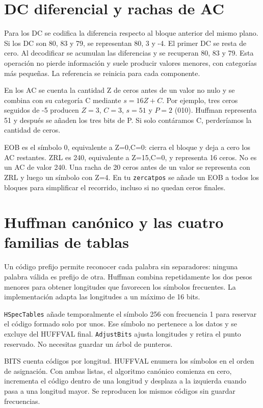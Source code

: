 \documentclass[11pt,a4paper,oneside]{report}
\begin{document}
\section{DC diferencial y rachas de AC}

Para los DC se codifica la diferencia respecto al bloque anterior del mismo
plano. Si los DC son 80, 83 y 79, se representan 80, 3 y -4. El primer
DC se resta de cero. Al decodificar se acumulan las diferencias y se recuperan
80, 83 y 79. Esta operación no pierde información y suele producir valores
menores, con categorías más pequeñas. La referencia se reinicia para cada componente.

En los AC se cuenta la cantidad Z de ceros antes de un valor no nulo y se
combina con su categoría C mediante $s=16Z+C$. Por ejemplo, tres ceros
seguidos de -5 producen $Z=3$, $C=3$, $s=51$ y $P=2$ (010).
Huffman representa 51 y después se añaden los tres bits de P. Si solo
contáramos C, perderíamos la cantidad de ceros.

EOB es el símbolo 0, equivalente a Z=0,C=0: cierra el bloque y deja a cero
los AC restantes. ZRL es 240, equivalente a Z=15,C=0, y representa 16 ceros.
No es un AC de valor 240. Una racha de 20 ceros antes de un valor se representa
con ZRL y luego un símbolo con Z=4. En tu \texttt{zercatpos} se añade un EOB
a todos los bloques para simplificar el recorrido, incluso si no quedan ceros finales.


\section{Huffman canónico y las cuatro familias de tablas}

Un código prefijo permite reconocer cada palabra sin separadores: ninguna
palabra válida es prefijo de otra. Huffman combina repetidamente los dos
pesos menores para obtener longitudes que favorecen los símbolos frecuentes.
La implementación adapta las longitudes a un máximo de 16 bits.

\texttt{HSpecTables} añade temporalmente el símbolo 256 con frecuencia 1
para reservar el código formado solo por unos. Ese símbolo no pertenece
a los datos y se excluye del HUFFVAL final. \texttt{AdjustBits} ajusta longitudes
y retira el punto reservado. No necesitas guardar un árbol de punteros.

BITS cuenta códigos por longitud. HUFFVAL enumera los símbolos en el orden
de asignación. Con ambas listas, el algoritmo canónico comienza en cero,
incrementa el código dentro de una longitud y desplaza a la izquierda cuando
pasa a una longitud mayor. Se reproducen los mismos códigos sin guardar frecuencias.
\end{document}
